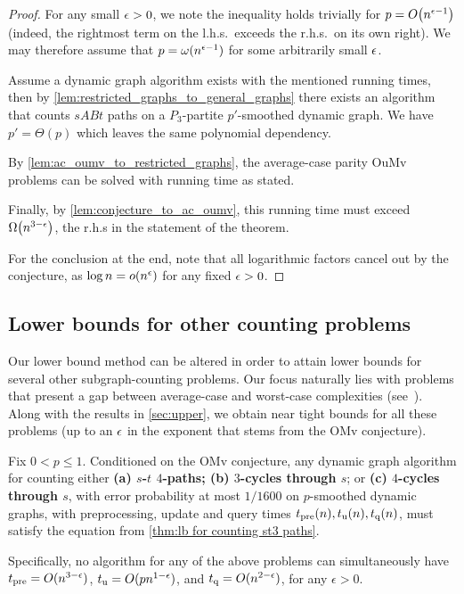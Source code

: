 \documentclass[letter,11pt]{article}
\newcommand{\omv}{\textnormal{\textsf{OMv}}\xspace}
\newcommand{\oumv}{\textnormal{\textsf{OuMv}}\xspace}
\newcommand{\paths}[3]{${#1}$-${#2}$ ${#3}$-paths\xspace}
\newcommand{\tp}{t_{\textnormal{pre}}}
\newcommand{\tu}{t_{\textnormal{u}}}
\newcommand{\tq}{t_{\textnormal{q}}}
\begin{document}
\begin{proof}
    For any small $\epsilon > 0$, we note the inequality holds trivially for $p = O\left(n^{\eps-1}\right)$ (indeed, the rightmost term on the l.h.s.\ exceeds the r.h.s.\ on its own right).
    We may therefore assume that $p = \omega(n^{\epsilon-1})$ for some arbitrarily small $\epsilon$.
    
    Assume a dynamic graph algorithm exists with the mentioned running times, then by \cref{lem:restricted_graphs_to_general_graphs} there exists an algorithm that counts $sABt$ paths on a $P_3$-partite $p'$-smoothed dynamic graph. We have $p' = \Theta(p)$ which leaves the same polynomial dependency.
     
    By \cref{lem:ac_oumv_to_restricted_graphs}, the average-case parity \oumv problems can be solved with running time as stated.
    
    Finally, by \cref{lem:conjecture_to_ac_oumv}, this running time must exceed $\Omega\left(n^{3-\eps}\right)$, the r.h.s in the statement of the theorem.

    For the conclusion at the end, note that all logarithmic factors cancel out by the conjecture, as $\log n = o(n^{\epsilon})$ for any fixed $\epsilon > 0$.
\end{proof}


\subsection{Lower bounds for other counting problems}
\label{sec:lb_other_small_graphs}
Our lower bound method can be altered in order to attain lower bounds for several other subgraph-counting problems. Our focus naturally lies with problems that present a gap between average-case and worst-case complexities (see~\cite{HLS22}). 
Along with the results in \cref{sec:upper}, we obtain near tight bounds for all these problems (up to an $\epsilon$ in the exponent that stems from the \omv conjecture). 

\begin{theorem}
\label{thm:lb for counting st4 paths s3 and s4 cycles}
    Fix $0 < p \leq 1$. 
    Conditioned on the \omv conjecture, any dynamic graph algorithm for counting either
\textbf{%
	(a) \paths{s}{t}{4}; (b) $3$-cycles through $s$}; or \textbf{(c) $4$-cycles through $s$},
with error probability at most $1/1600$ on $p$-smoothed dynamic graphs, with preprocessing, update and query times $\tp(n), \tu(n), \tq(n)$,
must satisfy the equation from \cref{thm:lb for counting st3 paths}.

    Specifically, no algorithm for any of the above problems 
    can simultaneously have
    $\tp=O(n^{3-\epsilon})$,
    $\tu=O(pn^{1-\epsilon})$,
    and
    $\tq=O(n^{2-\epsilon})$,  
    for any $\epsilon>0$.
\end{theorem}
\end{document}
